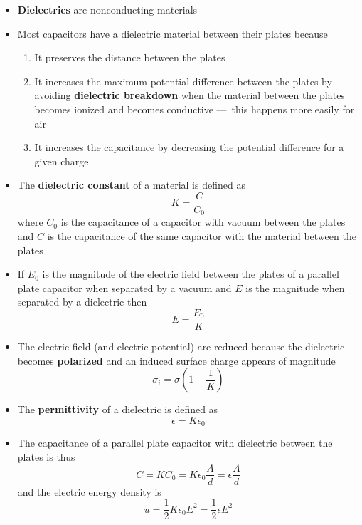 \documentclass{article}
\begin{document}
\begin{itemize}
  \item \textbf{Dielectrics} are nonconducting materials

  \item Most capacitors have a dielectric material between their plates because

        \begin{enumerate}
          \item It preserves the distance between the plates

          \item It increases the maximum potential difference between the plates by avoiding \textbf{dielectric breakdown} when the material between the plates becomes ionized and becomes conductive — this happens more easily for air

          \item It increases the capacitance by decreasing the potential difference for a given charge
        \end{enumerate}

  \item The \textbf{dielectric constant} of a material is defined as \[K = \frac{C}{C_0}\] where $C_0$ is the capacitance of a capacitor with vacuum between the plates and $C$ is the capacitance of the same capacitor with the material between the plates

  \item If $E_0$ is the magnitude of the electric field between the plates of a parallel plate capacitor when separated by a vacuum and $E$ is the magnitude when separated by a dielectric then \[E = \frac{E_0}{K}\]

  \item The electric field (and electric potential) are reduced because the dielectric becomes \textbf{polarized} and an induced surface charge appears of magnitude \[\sigma_i = \sigma \left( 1 - \frac{1}{K} \right)\]

  \item The \textbf{permittivity} of a dielectric is defined as \[\epsilon = K \epsilon_0\]

  \item The capacitance of a parallel plate capacitor with dielectric between the plates is thus \[C = K C_0 = K \epsilon_0 \frac{A}{d} = \epsilon \frac{A}{d}\] and the electric energy density is \[u = \frac{1}{2} K \epsilon_0 E^2 = \frac{1}{2} \epsilon E^2\]
\end{itemize}
\end{document}

